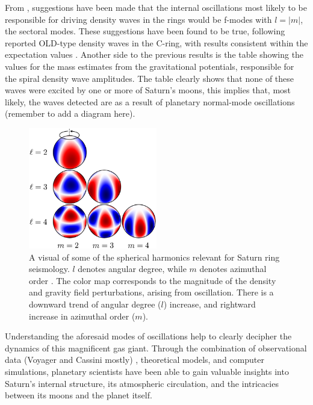 \documentclass{article}
\begin{document}
From \cite{Marley1993PlanetaryAM} \cite{FRENCH2021114660}, suggestions have been made that the internal oscillations most likely to be responsible for driving density waves in the rings would be f-modes with $l=|m|$, the sectoral modes. These suggestions have been found to be true, following reported OLD-type density waves in the C-ring, with results consistent within the expectation values \cite{Hedman_2013} \cite{10.1093/mnras/stu1503}. Another side to the previous results is the table showing the values for the mass estimates from the gravitational potentials, responsible for the spiral density wave amplitudes. The table clearly shows that none of these waves were excited by one or more of Saturn's moons, this implies that, most likely, the waves detected are as a result of planetary normal-mode oscillations (remember to add a diagram here).
\begin{figure}[h] 
\centering
\includegraphics[width=0.5\textwidth]{mankovitch2.png}
\caption{A visual of some of the spherical harmonics relevant for Saturn ring seismology. $l$ denotes angular degree, while $m$ denotes azimuthal order \cite{Mankovich_2019}.  The color map corresponds to the magnitude of the density and gravity field perturbations, arising from oscillation. There is a downward trend of angular
degree ($l$) increase, and rightward increase in azimuthal order ($m$).} \label{fig:my_label}
\end{figure}

Understanding the aforesaid modes of oscillations help to clearly decipher the dynamics of this magnificent gas giant. Through the combination of observational data (Voyager and Cassini mostly) , theoretical models, and computer simulations, planetary scientists have been able to gain valuable insights into Saturn's internal structure, its atmospheric circulation, and the intricacies between its moons and the planet itself.

\end{document}
